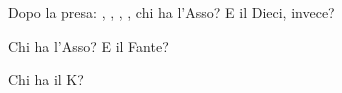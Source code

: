 \documentclass[../corsofiori.tex]{subfiles}
\begin{document}
\bigskip
\hspace{-.7cm}
\begin{minipage}{.45\textwidth}

    Dopo la presa: , , , , chi ha l'Asso? E il
    Dieci, invece?  
\end{minipage}\hfill\qquad
\begin{minipage}{.45\textwidth}

Chi ha l'Asso? E il Fante?
\end{minipage}\hfill
\bigskip

\hspace{-.7cm}
\begin{minipage}{.45\textwidth}

    Chi ha il K?
\end{minipage}\hfill
\end{document}
